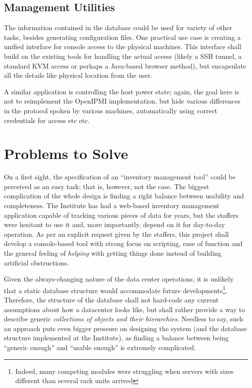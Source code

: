 \documentclass{article}
\begin{document}
\subsection{Management Utilities}

The information contained in the database could be used for variety of other tasks, besides generating configuration files.  One
practical use case is creating a unified interface for console access to the physical machines.  This interface shall build on the
existing tools for handling the actual access (likely a SSH tunnel, a standard KVM access or perhaps a Java-based browser method),
but encapsulate all the details like physical location from the user.

A similar application is controlling the host power state; again, the goal here is not to reimplement the OpenIPMI implementation,
but hide various differences in the protocol spoken by various machines, automatically using correct credentials for access etc
etc.

\section{Problems to Solve}

On a first sight, the specification of an ``inventory management tool'' could be perceived as an easy task; that is, however, not
the case.  The biggest complication of the whole design is finding a right balance between usability and completeness.  The
Institute has had a web-based inventory management application capable of tracking various pieces of data for years, but the
staffers were hesitant to use it and, more importantly, depend on it for day-to-day operation.  As per an explicit request given
by the staffers, this project shall develop a console-based tool with strong focus on scripting, ease of function and the general
feeling of {\em helping} with getting things done instead of building artificial obstructions.

Given the always-changing nature of the data center operations, it is unlikely that a static database structure would accommodate
future developments\footnote{Indeed, many competing modules were struggling when servers with sizes different than several rack
units arrived}.  Therefore, the structure of the database shall not hard-code any current assumptions about how a datacenter looks
like, but shall rather provide a way to describe generic {\em collections of objects and their hierarchies}.  Needless to say,
such an approach puts even bigger pressure on designing the system (and the database structure implemented at the Institute), as
finding a balance between being ``generic enough'' and ``usable enough'' is extremely complicated.
\end{document}
